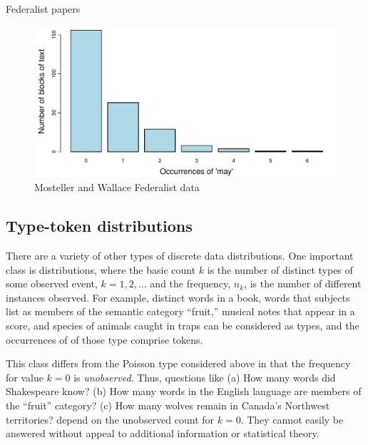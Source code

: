\documentclass[11pt]{book}\usepackage[]{graphicx}\usepackage[]{color}
\newenvironment{knitrout}{}{} %
\renewenvironment{knitrout}{\small\renewcommand{\baselinestretch}{.85}}{} %
\begin{document}
\begin{Example}[madison1]{Federalist papers}
\begin{knitrout}
\begin{figure}[htbp]
\centerline{\includegraphics[width=.75\textwidth]{ch03/fig/federalist} }

\caption[Mosteller and Wallace Federalist data]{Mosteller and Wallace Federalist data\label{fig:federalist}}
\end{figure}


\end{knitrout}

\end{Example}

\subsection{Type-token distributions}\label{sec:type-token}

There are a variety of other types of discrete data distributions.
One important class is  distributions, where
the basic count $k$ is the number of distinct types of some observed
event, $k = 1, 2, \dots$ and the frequency, $n_k$, is the number of
different instances observed.  For example, distinct words in a book,
words that subjects list as members of the semantic category ``fruit,''
musical notes that appear in a score, and species of animals caught
in traps can be considered as types, and the occurrences of
of those type comprise tokens.  

This class differs from the Poisson type considered above
in that the frequency for value $k=0$ is \emph{unobserved}.  Thus, questions like
(a) How many words did Shakespeare know?
(b) How many words in the English language are members of the
``fruit'' category?
(c) How many wolves remain in Canada's Northwest territories?
depend on the unobserved count for $k=0$. They 
cannot easily be answered without appeal to additional information
or statistical theory.
\end{document}
